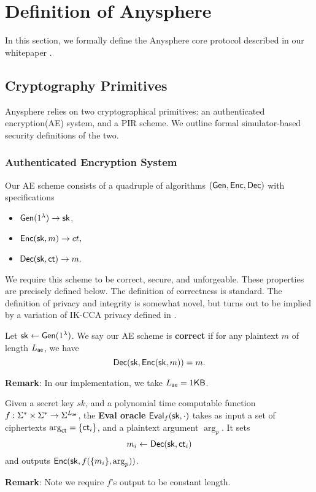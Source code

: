 \section{Definition of Anysphere}
\label{sec:asphr-defn}
In this section, we formally define the Anysphere core protocol described in our whitepaper \cite{whitepaper}. 
\subsection{Cryptography Primitives}
Anysphere relies on two cryptographical primitives: an authenticated encryption(AE) system, and a PIR scheme. We outline formal simulator-based security definitions of the two. 

\subsubsection{Authenticated Encryption System}
\label{subsec:AE}
Our AE scheme consists of a quadruple of algorithms $(\mathsf{Gen}, \mathsf{Enc}, \mathsf{Dec})$ with specifications
\begin{itemize}
    \item $\mathsf{Gen}(1^{\lambda}) \to {\ensuremath{\mathsf{sk}}}$,
    \item $\mathsf{Enc}({\mathsf{sk}}, m) \to ct,$
    \item $\mathsf{Dec}({\mathsf{sk}}, \mathsf{ct}) \to m.$
\end{itemize}
We require this scheme to be correct, secure, and unforgeable. These properties are precisely defined below. The definition of correctness is standard. The definition of privacy and integrity is somewhat novel, but turns out to be implied by a variation of IK-CCA privacy defined in \cite{BBDP01keyprivate}.

\begin{definition}
\label{defn:AE-correctness}
Let ${\mathsf{sk}} \leftarrow \mathsf{Gen}(1^{\lambda})$. We say our AE scheme is \textbf{correct} if for any plaintext $m$ of length $L_{\mathsf{ae}}$, we have
$$\mathsf{Dec}({\mathsf{sk}}, \mathsf{Enc}({\mathsf{sk}}, m)) = m.$$
\end{definition}
\textbf{Remark}: In our implementation, we take $L_{\mathsf{ae}} = 1 \mathsf{KB}$.

\begin{definition}
\label{defn:AE-eval-oracle}
Given a secret key $sk$, and a polynomial time computable function $f: \Sigma^* \times \Sigma^* \to \Sigma^{L_{\mathsf{ae}}}$, the \textbf{Eval oracle} $\mathsf{Eval}_{f}({\mathsf{sk}}, \cdot)$ takes as input a set of ciphertexts $\arg_{\mathsf{ct}} = \{\mathsf{ct}_i\}$, and a plaintext argument $\arg_{p}$. It sets 
$$m_i \leftarrow \mathsf{Dec}({\mathsf{sk}}, \mathsf{ct}_i)$$ 
and outputs $\mathsf{Enc}({\mathsf{sk}}, f(\{m_i\}, \arg_p))$.
\end{definition}
\textbf{Remark}: Note we require $f$'s output to be constant length. 

